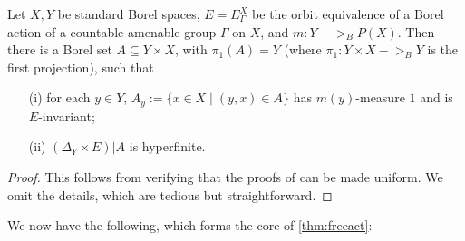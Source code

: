 \documentclass[11pt]{article}
\begin{document}
\begin{lemma}
\label{thm:ow-uniform}
Let $X, Y$ be standard Borel spaces, $E = E_\Gamma^X$ be the orbit equivalence of a Borel action of a countable amenable group $\Gamma$ on $X$, and $m : Y ->_B P(X)$.  Then there is a Borel set $A \subseteq Y \times X$, with $\pi_1(A) = Y$ (where $\pi_1 : Y \times X ->_B Y$ is the first projection), such that
\begin{enumerate}
\item[(i)]  for each $y \in Y$, $A_y := \{x \in X \mid (y, x) \in A\}$ has $m(y)$-measure $1$ and is $E$-invariant;
\item[(ii)]  $(\Delta_Y \times E)|A$ is hyperfinite.
\end{enumerate}
\end{lemma}
\begin{proof}
This follows from verifying that the proofs of \cite[9.2, 10.1]{KM} can be made uniform.  We omit the details, which are tedious but straightforward.
\end{proof}

We now have the following, which forms the core of \cref{thm:freeact}:
\end{document}
